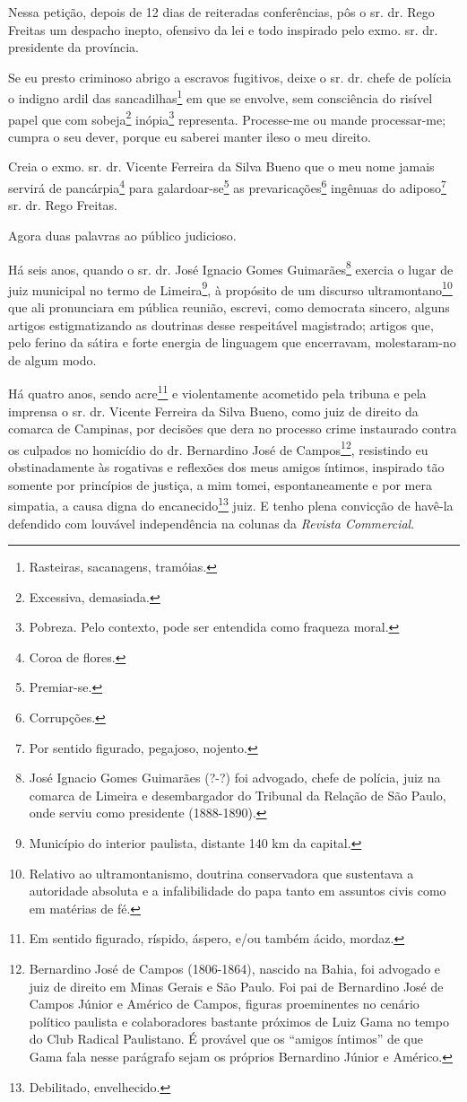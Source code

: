 Nessa petição, depois de 12 dias de reiteradas conferências, pôs o sr.
dr. Rego Freitas um despacho inepto, ofensivo da lei e todo inspirado
pelo exmo. sr. dr. presidente da província.

Se eu presto criminoso abrigo a escravos fugitivos, deixe o sr. dr.
chefe de polícia o indigno ardil das sancadilhas\footnote{Rasteiras,
  sacanagens, tramóias.} em que se envolve, sem consciência do risível
papel que com sobeja\footnote{Excessiva, demasiada.} inópia\footnote{
  Pobreza. Pelo contexto, pode ser entendida como fraqueza moral.}
representa. Processe-me ou mande processar-me; cumpra o seu dever,
porque eu saberei manter ileso o meu direito.

Creia o exmo. sr. dr. Vicente Ferreira da Silva Bueno que o meu nome
jamais servirá de pancárpia\footnote{Coroa de flores.} para
galardoar-se\footnote{Premiar-se.} as prevaricações\footnote{
  Corrupções.} ingênuas do adiposo\footnote{Por sentido figurado,
  pegajoso, nojento.} sr. dr. Rego Freitas.

Agora duas palavras ao público judicioso.

Há seis anos, quando o sr. dr. José Ignacio Gomes Guimarães\footnote{
  José Ignacio Gomes Guimarães (?-?) foi advogado, chefe de polícia,
  juiz na comarca de Limeira e desembargador do Tribunal da Relação de
  São Paulo, onde serviu como presidente (1888-1890).} exercia o lugar
de juiz municipal no termo de Limeira\footnote{Município do interior
  paulista, distante 140 km da capital.}, à propósito de um discurso
ultramontano\footnote{Relativo ao ultramontanismo, doutrina
  conservadora que sustentava a autoridade absoluta e a infalibilidade
  do papa tanto em assuntos civis como em matérias de fé.} que ali
pronunciara em pública reunião, escrevi, como democrata sincero, alguns
artigos estigmatizando as doutrinas desse respeitável magistrado;
artigos que, pelo ferino da sátira e forte energia de linguagem que
encerravam, molestaram-no de algum modo.

Há quatro anos, sendo acre\footnote{Em sentido figurado, ríspido,
  áspero, e/ou também ácido, mordaz.} e violentamente acometido pela
tribuna e pela imprensa o sr. dr. Vicente Ferreira da Silva Bueno, como
juiz de direito da comarca de Campinas, por decisões que dera no
processo crime instaurado contra os culpados no homicídio do dr.
Bernardino José de Campos\footnote{Bernardino José de Campos
  (1806-1864), nascido na Bahia, foi advogado e juiz de direito em Minas
  Gerais e São Paulo. Foi pai de Bernardino José de Campos Júnior e
  Américo de Campos, figuras proeminentes no cenário político paulista e
  colaboradores bastante próximos de Luiz Gama no tempo do Club Radical
  Paulistano. É provável que os ``amigos íntimos'' de que Gama fala nesse
  parágrafo sejam os próprios Bernardino Júnior e Américo.}, resistindo
eu obstinadamente às rogativas e reflexões dos meus amigos íntimos,
inspirado tão somente por princípios de justiça, a mim tomei,
espontaneamente e por mera simpatia, a causa digna do
encanecido\footnote{Debilitado, envelhecido.} juiz. E tenho plena
convicção de havê-la defendido com louvável independência na colunas da
\emph{Revista Commercial}.

